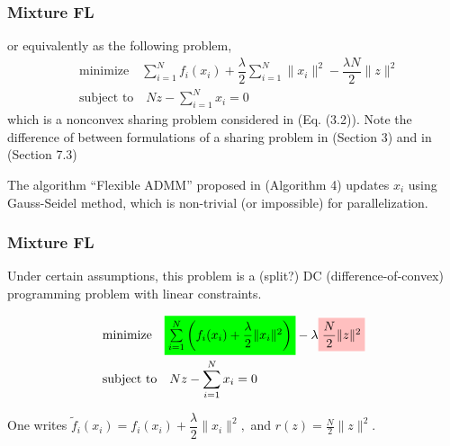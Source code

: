 \begin{frame}
\frametitle{Mixture FL}

or equivalently as the following problem,
\begin{align*}
    & \text{minimize} \quad \sum\limits_{i=1}^N f_i(x_i) + \dfrac{\lambda}{2} \sum\limits_{i=1}^N \lVert x_i \rVert^2 -\dfrac{\lambda N}{2} \lVert z \rVert^2 \\
    & \text{subject to} \quad Nz - \sum\limits_{i=1}^N x_i = 0
\end{align*}
which is a nonconvex sharing problem considered in \cite{hong2016convergence} (Eq. (3.2)). Note the difference of between formulations of a sharing problem in \cite{hong2016convergence} (Section 3) and in \cite{boyd2011distributed} (Section 7.3)

\vspace{0.8em}

The algorithm ``Flexible ADMM'' proposed in \cite{hong2016convergence} (Algorithm 4) updates $x_i$ using Gauss-Seidel method, which is non-trivial (or impossible) for parallelization.

\end{frame}


\begin{frame}
\frametitle{Mixture FL}

Under certain assumptions, this problem is a (split?) DC (difference-of-convex) programming problem {\color{red} with linear constraints}.

\begin{align*}
    & \text{minimize} \quad \colorbox{green}{$\sum\limits_{i=1}^N \left( f_i(x_i) + \dfrac{\lambda}{2} \lVert x_i \rVert^2 \right)$} - \lambda \colorbox{pink}{$\dfrac{N}{2} \lVert z \rVert^2$} \\
    & \text{subject to} \quad Nz - \sum\limits_{i=1}^N x_i = 0
\end{align*}

One writes $\widetilde{f}_i (x_i) =  f_i(x_i) + \dfrac{\lambda}{2} \lVert x_i \rVert^2,$ and $r(z) = \frac{N}{2} \lVert z \rVert^2$.

\end{frame}

